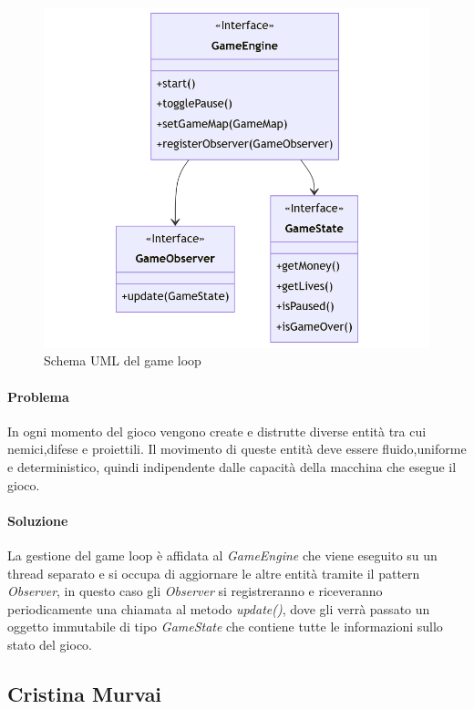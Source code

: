 \documentclass[a4paper,12pt]{report}
\begin{document}
\begin{figure}[H]
	\centering{}
	\includegraphics[width=\textwidth]{GameLoop}
	\caption{Schema UML del game loop}
	\label{fig:GameLoop}
\end{figure}

\paragraph{Problema} In ogni momento del gioco vengono create e distrutte diverse entità tra cui nemici,difese e proiettili.
Il movimento di queste entità deve essere fluido,uniforme e deterministico, quindi indipendente dalle capacità della macchina 
che esegue il gioco.

\paragraph{Soluzione} La gestione del game loop è affidata al \textit{GameEngine} che viene eseguito su un thread separato e 
si occupa di aggiornare le altre entità tramite il pattern \textit{Observer}, in questo caso gli \textit{Observer} si registreranno
e riceveranno periodicamente una chiamata al metodo \textit{update()}, dove gli verrà passato un oggetto immutabile di tipo
\textit{GameState} che contiene tutte le informazioni sullo stato del gioco.

\subsection{Cristina Murvai}
\end{document}

